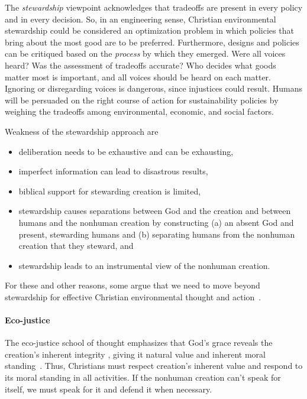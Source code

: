 \documentclass[12pt]{article}
\begin{document}
The \emph{stewardship} viewpoint acknowledges that tradeoffs
are present in every policy and in every decision. 
So, in an engineering sense, 
Christian environmental stewardship could be considered an optimization problem
in which policies that bring about the most good 
are to be preferred.
Furthermore, designs and policies can be critiqued 
based on the \emph{process} by which they emerged.
Were all voices heard? Was the assessment of tradeoffs accurate?
Who decides what goods matter most is important, and 
all voices should be heard on each matter.
Ignoring or disregarding voices is dangerous,
since injustices could result.
Humans will be persuaded on the right course of action
for sustainability policies by weighing the tradeoffs 
among environmental, economic, and social factors.

Weakness of the stewardship approach are
%
\begin{itemize}

  \item deliberation needs to be exhaustive and can be exhausting,

  \item imperfect information can lead to disastrous results,
  
  \item biblical support for stewarding creation is limited,
  
  \item stewardship causes separations between God and the creation and between 
        humans and the nonhuman creation by constructing 
		(a) an absent God and present, stewarding humans and 
		(b) separating humans from the nonhuman creation that they steward, and
		
  \item stewardship leads to an instrumental view of the nonhuman creation.

\end{itemize}

For these and other reasons, some argue that we need to move beyond stewardship 
for effective Christian environmental thought and action~\autocite{WarnersHeun:2019aa}.


\paragraph{Eco-justice} 
\label{sec:eco-justice}

The eco-justice school of thought 
emphasizes that God's grace reveals the creation's 
inherent integrity \autocite[19]{Jenkins:2008}, 
giving it natural value and inherent moral standing~\autocite{Joldersma:2019}. 
Thus, Christians must respect creation's inherent value and 
respond to its moral standing in all activities.
If the nonhuman creation can't speak for itself, 
we must speak for it and defend it when necessary.
\end{document}
